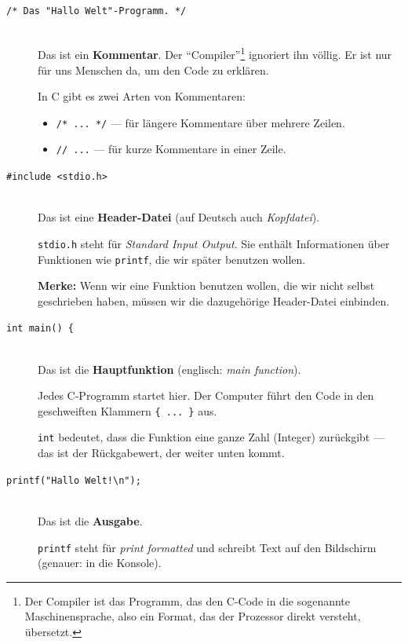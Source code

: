 \begin{description}
    \item[\texttt{/* Das "Hallo Welt"{}-Programm. */}]\hfill\\
        Das ist ein \textbf{Kommentar}.
        Der ``Compiler''\footnote{%
            Der Compiler ist das Programm, das den C-Code in die sogenannte Maschinensprache, also ein Format, das der Prozessor direkt versteht, übersetzt.}
        ignoriert ihn völlig. Er ist nur für uns Menschen da,
        um den Code zu erklären.

        In C gibt es zwei Arten von Kommentaren:
        \begin{itemize}
            \item \texttt{/* ... */} — für längere Kommentare über mehrere Zeilen.
            \item \texttt{// ...} — für kurze Kommentare in einer Zeile.
        \end{itemize}

    \item[\texttt{\#include <stdio.h>}]\hfill\\
        Das ist eine \textbf{Header-Datei} (auf Deutsch auch \emph{Kopfdatei}).

        \texttt{stdio.h} steht für \textit{Standard Input Output}.
        Sie enthält Informationen über Funktionen wie \texttt{printf},
        die wir später benutzen wollen.

        \textbf{Merke:} Wenn wir eine Funktion benutzen wollen, die wir nicht
        selbst geschrieben haben, müssen wir die dazugehörige Header-Datei
        einbinden.

    \item[\texttt{int main() \{ }]\hfill\\
        Das ist die \textbf{Hauptfunktion} (englisch: \textit{main function}).

        Jedes C-Programm startet hier. Der Computer führt den Code in den
        geschweiften Klammern \texttt{\{ ... \}} aus.

        \texttt{int} bedeutet, dass die Funktion eine ganze Zahl (Integer)
        zurückgibt — das ist der Rückgabewert, der weiter unten kommt.

    \item[\texttt{printf("Hallo Welt!\backslash n");}]\hfill\\
        Das ist die \textbf{Ausgabe}.

        \texttt{printf} steht für \textit{print formatted} und schreibt Text
        auf den Bildschirm (genauer: in die Konsole).


\end{description}
